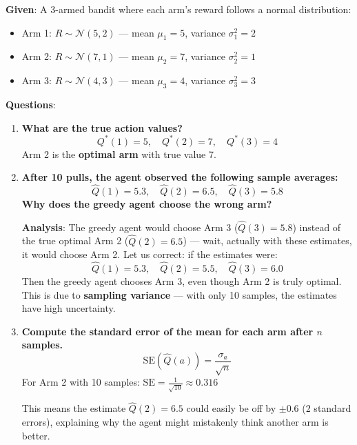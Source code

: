 \documentclass[11pt,a4paper]{article}
\begin{document}
\begin{tcolorbox}[colback=green!5!white,colframe=green!75!black,title=\textbf{Worked Example: Computing True Values and Sample Estimates}]
\textbf{Given}: A 3-armed bandit where each arm's reward follows a normal distribution:
\begin{itemize}
    \item Arm 1: $R \sim \mathcal{N}(5, 2)$ --- mean $\mu_1 = 5$, variance $\sigma_1^2 = 2$
    \item Arm 2: $R \sim \mathcal{N}(7, 1)$ --- mean $\mu_2 = 7$, variance $\sigma_2^2 = 1$
    \item Arm 3: $R \sim \mathcal{N}(4, 3)$ --- mean $\mu_3 = 4$, variance $\sigma_3^2 = 3$
\end{itemize}

\textbf{Questions}:
\begin{enumerate}
    \item \textbf{What are the true action values?}
    \[
    Q^*(1) = 5, \quad Q^*(2) = 7, \quad Q^*(3) = 4
    \]
    Arm 2 is the \textbf{optimal arm} with true value 7.
    
    \item \textbf{After 10 pulls, the agent observed the following sample averages:}
    \[
    \hat{Q}(1) = 5.3, \quad \hat{Q}(2) = 6.5, \quad \hat{Q}(3) = 5.8
    \]
    \textbf{Why does the greedy agent choose the wrong arm?}
    
    \textbf{Analysis}: The greedy agent would choose Arm 3 ($\hat{Q}(3) = 5.8$) instead of the true optimal Arm 2 ($\hat{Q}(2) = 6.5$) --- wait, actually with these estimates, it would choose Arm 2. Let us correct: if the estimates were:
    \[
    \hat{Q}(1) = 5.3, \quad \hat{Q}(2) = 5.5, \quad \hat{Q}(3) = 6.0
    \]
    Then the greedy agent chooses Arm 3, even though Arm 2 is truly optimal. This is due to \textbf{sampling variance} --- with only 10 samples, the estimates have high uncertainty.
    
    \item \textbf{Compute the standard error of the mean for each arm after $n$ samples.}
    \[
    \text{SE}(\hat{Q}(a)) = \frac{\sigma_a}{\sqrt{n}}
    \]
    For Arm 2 with 10 samples: $\text{SE} = \frac{1}{\sqrt{10}} \approx 0.316$
    
    This means the estimate $\hat{Q}(2) = 6.5$ could easily be off by $\pm 0.6$ (2 standard errors), explaining why the agent might mistakenly think another arm is better.
\end{enumerate}
\end{tcolorbox}
\end{document}
